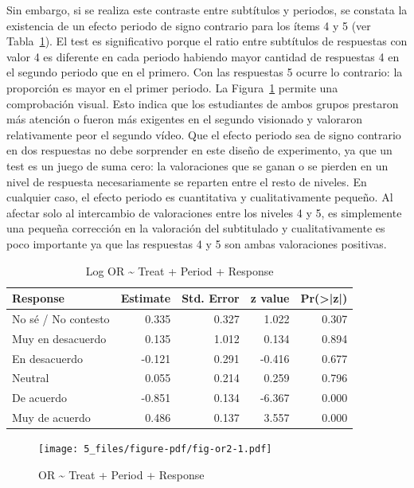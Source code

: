 \documentclass[
  12pt,
  a4paper,
  extrafontsizes,
  onecolumn,
  openright,
  table]{memoir}
\begin{document}
Sin embargo, si se realiza este contraste entre subtítulos y periodos,
se constata la existencia de un \gls{efecto periodo} de signo contrario
para los ítems 4 y 5 (ver Tabla~\ref{tbl-logor2}). El test es
significativo porque el ratio entre subtítulos de respuestas con valor 4
es diferente en cada periodo habiendo mayor cantidad de respuestas 4 en
el segundo periodo que en el primero. Con las respuestas 5 ocurre lo
contrario: la proporción es mayor en el primer periodo. La
Figura~\ref{fig-or2} permite una comprobación visual. Esto indica que
los estudiantes de ambos grupos prestaron más atención o fueron más
exigentes en el segundo visionado y valoraron relativamente peor el
segundo vídeo. Que el efecto periodo sea de signo contrario en dos
respuestas no debe sorprender en este diseño de experimento, ya que un
test es un juego de suma cero: la valoraciones que se ganan o se pierden
en un nivel de respuesta necesariamente se reparten entre el resto de
niveles. En cualquier caso, el efecto periodo es cuantitativa y
cualitativamente pequeño. Al afectar solo al intercambio de valoraciones
entre los niveles 4 y 5, es simplemente una pequeña corrección en la
valoración del subtitulado y cualitativamente es poco importante ya que
las respuestas 4 y 5 son ambas valoraciones positivas.

\hypertarget{tbl-logor2}{}
\begin{longtable}{lrrrr}
\caption{\label{tbl-logor2}Log OR \textasciitilde{} Treat + Period + Response }\tabularnewline

\toprule
Response & Estimate & Std. Error & z value & Pr(>|z|) \\ 
\midrule
No sé / No contesto & 0.335 & 0.327 & 1.022 & 0.307 \\ 
Muy en desacuerdo & 0.135 & 1.012 & 0.134 & 0.894 \\ 
En desacuerdo & -0.121 & 0.291 & -0.416 & 0.677 \\ 
Neutral & 0.055 & 0.214 & 0.259 & 0.796 \\ 
De acuerdo & -0.851 & 0.134 & -6.367 & 0.000 \\ 
Muy de acuerdo & 0.486 & 0.137 & 3.557 & 0.000 \\ 
\bottomrule
\end{longtable}

\begin{figure}[h]

{\centering \texttt{[image: 5\_files/figure-pdf/fig-or2-1.pdf]}

}

\caption[Test Odds Ratio \textasciitilde{} Treat + Period +
Response]{\label{fig-or2}OR \textasciitilde{} Treat + Period + Response}

\end{figure}
\end{document}
